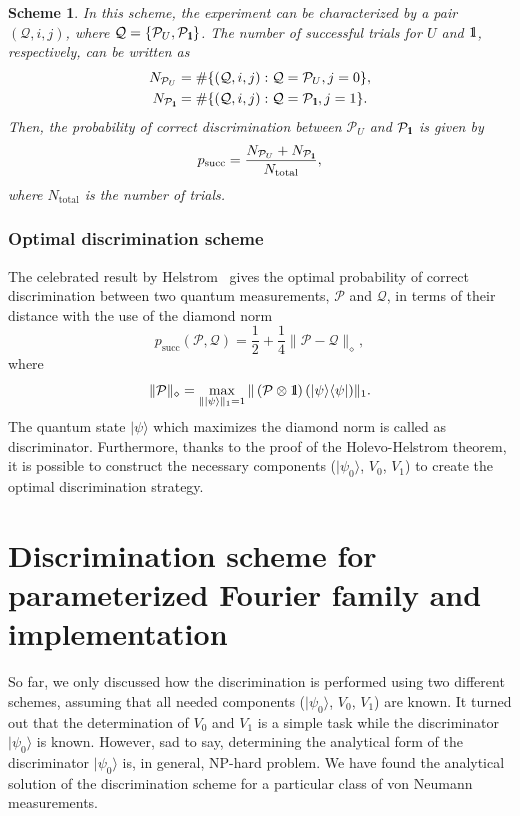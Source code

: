 \documentclass[preprint,12pt, a4paper, dvipsnames]{elsarticle}
\newcommand{\ket}[1]{\ensuremath{|#1\rangle}}
\newcommand{\bra}[1]{\ensuremath{\langle#1|}}
\newcommand{\ketbra}[2]{\ensuremath{\ket{#1}\bra{#2}}}
\newcommand{\proj}[1]{\ensuremath{\ketbra{#1}{#1}}}
\newcommand{\1}{{\rm 1\hspace{-0.9mm}l}}
\newcommand{\Id}{{\rm 1\hspace{-0.9mm}l}}
\newcommand{\PP}{\mathcal{P}}
\newtheorem{scheme}{Scheme}
\begin{document}
\begin{scheme}
	In this scheme, the experiment can be characterized by a pair $(\mathcal{Q}, i,j)$, where $\mathcal{Q} = \{ \PP_{U}, \PP_{\Id} \}$. The number of successful trials for $U$ and $\Id$, respectively, can be written  as
	\begin{eqnarray}
	N_{\PP_U} &= \#\{(\mathcal{Q},  i, j): \mathcal{Q} = \PP_U, j = 0\}, \\
	N_{\PP_\Id} &= \#\{(\mathcal{Q},  i, j): \mathcal{Q} = \PP_\Id, j = 1\}.
	\end{eqnarray}
	Then, the probability of correct discrimination between $\PP_{U} $ and $\PP_\Id$ is given by
	\begin{equation}
	p_{\text{succ}} = \frac{N_{\PP_{U}} + N_{\PP_{\Id}}}{N_{\text{total}}},
	\end{equation}
	where $N_{\text{total}}$ is the number of trials.
\end{scheme}




\subsubsection{Optimal discrimination scheme}


The celebrated result by Helstrom~\cite{helstrom1976quantum} gives the optimal  probability of correct discrimination between two quantum measurements, $\PP$  and $\mathcal{Q}$,
in terms of their distance with the use of the diamond norm
\begin{equation}
p_{\text{succ}}(\PP, \mathcal{Q}) =  \frac12 + \frac14 \| \PP - \mathcal{Q} \|_\diamond,
\end{equation}
where
\begin{equation}
\|\PP\|_\diamond = \max_{\| \ket{\psi}\|_1=1} \| \left(\PP \otimes \1\right) (\proj{\psi}) \|_1.
\end{equation}
The quantum state $\ket{\psi}$ which maximizes the diamond norm is called as discriminator.
Furthermore,  thanks to the proof of the Holevo-Helstrom theorem, it is possible to construct the necessary components  ($\ket{\psi_0}$, $V_0$, $V_1$) to create the optimal discrimination strategy.




\section{Discrimination scheme for parameterized Fourier family and implementation}


So far, we only discussed how the discrimination is performed using two different
schemes, assuming that all needed components ($\ket{\psi_0}$, $V_0$, $V_1$) are known. It turned out that the determination of $V_0$ and $V_1$ is a simple task while the discriminator $\ket{\psi_{0}}$ is known. However,
sad to say, determining the analytical form of the discriminator $\ket{\psi_{0}}$
is, in general, NP-hard problem.
We have found the analytical solution of the discrimination scheme for a particular class of von Neumann measurements.
\end{document}
